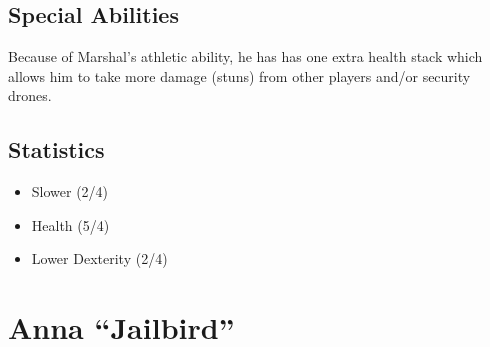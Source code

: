 \documentclass[10pt]{report}
\begin{document}
\begin{multicols}{2}
    \subsection{Special Abilities}
    
    Because of Marshal’s athletic ability, he has has one extra health stack which allows him to take more damage (stuns) from other players and/or security drones.
    
    \subsection{Statistics}
    
    \begin{itemize}
        \item Slower (2/4)
        \item Health (5/4)
        \item Lower Dexterity (2/4)
    \end{itemize}
\end{multicols}
    
\pagebreak

\section{Anna ``Jailbird''}
\end{document}
